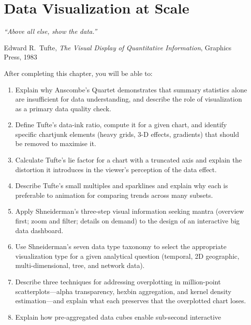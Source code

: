 
\chapter{Data Visualization at Scale}
\label{ch:visualization}

\epigraph{\textit{``Above all else, show the data.''}}{Edward R.\ Tufte,
\textit{The Visual Display of Quantitative Information},
Graphics Press, 1983}

\vspace{4pt}

\begin{chapterlearning}
After completing this chapter, you will be able to:
\begin{enumerate}
  \item Explain why Anscombe's Quartet demonstrates that summary statistics
        alone are insufficient for data understanding, and describe the
        role of visualization as a primary data quality check.
  \item Define Tufte's data-ink ratio, compute it for a given chart, and
        identify specific chartjunk elements (heavy grids, 3-D effects,
        gradients) that should be removed to maximise it.
  \item Calculate Tufte's lie factor for a chart with a truncated axis and
        explain the distortion it introduces in the viewer's perception of
        the data effect.
  \item Describe Tufte's small multiples and sparklines and explain why
        each is preferable to animation for comparing trends across many
        subsets.
  \item Apply Shneiderman's three-step visual information seeking mantra
        (overview first; zoom and filter; details on demand) to the design
        of an interactive big data dashboard.
  \item Use Shneiderman's seven data type taxonomy to select the appropriate
        visualization type for a given analytical question (temporal, 2D
        geographic, multi-dimensional, tree, and network data).
  \item Describe three techniques for addressing overplotting in
        million-point scatterplots---alpha transparency, hexbin aggregation,
        and kernel density estimation---and explain what each preserves
        that the overplotted chart loses.
  \item Explain how pre-aggregated data cubes enable sub-second interactive

\end{enumerate}
\end{chapterlearning}
